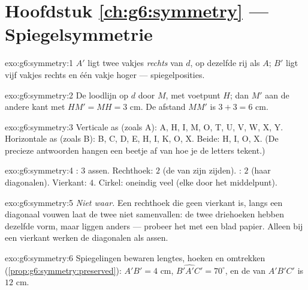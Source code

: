 \section*{Hoofdstuk \ref{ch:g6:symmetry} --- Spiegelsymmetrie}

\begin{solution}{exo:g6:symmetry:1}
$A'$ ligt twee vakjes \emph{rechts} van $d$, op dezelfde rij als $A$; $B'$ ligt
vijf vakjes rechts en één vakje hoger --- spiegelposities.
\end{solution}

\begin{solution}{exo:g6:symmetry:2}
De loodlijn op $d$ door $M$, met voetpunt $H$; dan $M'$ aan de andere kant met
$HM' = MH = 3$ cm. De afstand $MM'$ is $3 + 3 = 6$ cm.
\end{solution}

\begin{solution}{exo:g6:symmetry:3}
Verticale as (zoals A): A, H, I, M, O, T, U, V, W, X, Y.
Horizontale as (zoals B): B, C, D, E, H, I, K, O, X.
Beide: H, I, O, X.
(De precieze antwoorden hangen een beetje af van hoe je de letters tekent.)
\end{solution}

\begin{solution}{exo:g6:symmetry:4}
: $3$ assen. Rechthoek: $2$ (de  van zijn
zijden). : $2$ (haar diagonalen). Vierkant: $4$. Cirkel: oneindig veel (elke
 door het middelpunt).
\end{solution}

\begin{solution}{exo:g6:symmetry:5}
\emph{Niet waar.} Een rechthoek die geen vierkant is, langs een diagonaal
vouwen laat de twee  niet samenvallen: de twee driehoeken hebben dezelfde
vorm, maar liggen anders --- probeer het met een blad papier. Alleen bij een
vierkant werken de diagonalen als assen.
\end{solution}

\begin{solution}{exo:g6:symmetry:6}
Spiegelingen bewaren lengtes, hoeken en omtrekken
(\cref{prop:g6:symmetry:preserved}): $A'B' = 4$ cm,
$\widehat{B'A'C'} = 70^\circ$, en de  van $A'B'C'$ is $12$ cm.
\end{solution}

